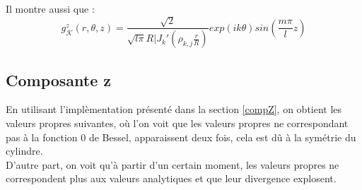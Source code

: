 Il montre aussi que :
\[
g_\mathcal{K}^z(r,\theta,z) = \frac{\sqrt{2}}{\sqrt{l\pi}R|J_k'\left(\rho_{k,j}\frac{r}{R}\right)}exp(ik\theta)sin\left(\frac{m\pi}{l}z\right)
\]

\iffalse

Pour mémoire, voici les résultats de différents modes obtenus avec freefem++.\\

\begin{figure}[H]
\makebox[\textwidth][c]{
\texttt{[image: Exemple\_de\_modes]}}
\end{figure}

On peut voir les mêmes modes obtenus avec Feel++ dans la figure \ref{modes}.\\

\begin{figure}[H]
	\makebox[\textwidth][c]{
		\subfloat[mode00]{\texttt{[image: mode00]}}\ 
		\subfloat[mode19]{\texttt{[image: mode19]}}
	}\\
	\makebox[\textwidth][c]{
		\subfloat[mode57]{\texttt{[image: mode57]}}\ 
		\subfloat[mode194]{\texttt{[image: mode194]}}
	}
	\caption{composante z des fonctions propres}
	\label{modes}
\end{figure}

\fi

\subsection{Composante z}

En utilisant l'implèmentation présenté dans la section \ref{compZ}, on obtient les valeurs propres suivantes, où l'on voit que les valeurs propres ne correspondant pas à la fonction 0 de Bessel, apparaissent deux fois, cela est dû à la symétrie du cylindre.\\
D'autre part, on voit qu'à partir d'un certain moment, les valeurs propres ne correspondent plus aux valeurs analytiques et que leur divergence explosent.\\

